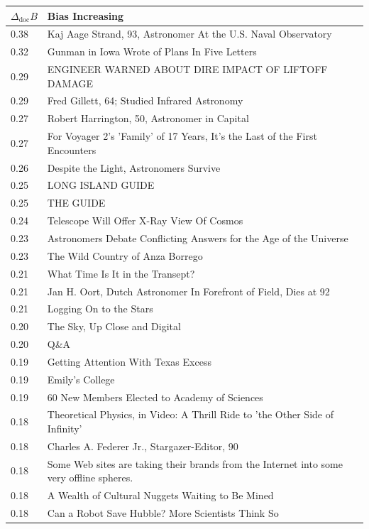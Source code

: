 \documentclass{article}
\begin{document}
\begin{center}
\begin{tabular}{ l p{8cm} }
\toprule
$\Delta_{\text{doc}} B$ & \textbf{Bias Increasing} \\
\midrule
0.38	& Kaj Aage Strand, 93, Astronomer At the U.S. Naval Observatory \\
0.32	& Gunman in Iowa Wrote of Plans In Five Letters \\
0.29	& ENGINEER WARNED ABOUT DIRE IMPACT OF LIFTOFF DAMAGE \\
0.29	& Fred Gillett, 64; Studied Infrared Astronomy \\
0.27	& Robert Harrington, 50, Astronomer in Capital \\
0.27	& For Voyager 2's 'Family' of 17 Years, It's the Last of the First Encounters \\
0.26	& Despite the Light, Astronomers Survive \\
0.25	& LONG ISLAND GUIDE \\
0.25	& THE GUIDE \\
0.24	& Telescope Will Offer X-Ray View Of Cosmos \\
0.23	& Astronomers Debate Conflicting Answers for the Age of the Universe \\
0.23	& The Wild Country of Anza Borrego \\
0.21	& What Time Is It in the Transept? \\
0.21	& Jan H. Oort, Dutch Astronomer In Forefront of Field, Dies at 92 \\
0.21	& Logging On to the Stars \\
0.20	& The Sky, Up Close and Digital \\
0.20	& Q\&A \\
0.19	& Getting Attention With Texas Excess \\
0.19	& Emily's College \\
0.19	& 60 New Members Elected to Academy of Sciences \\
0.18	& Theoretical Physics, in Video: A Thrill Ride to 'the Other Side of Infinity' \\
0.18	& Charles A. Federer Jr., Stargazer-Editor, 90 \\
0.18	& Some Web sites are taking their brands from the Internet into some very offline spheres. \\
0.18	& A Wealth of Cultural Nuggets Waiting to Be Mined \\
0.18	& Can a Robot Save Hubble? More Scientists Think So \\

\end{tabular}
\vfill

\end{center}
\end{document}
